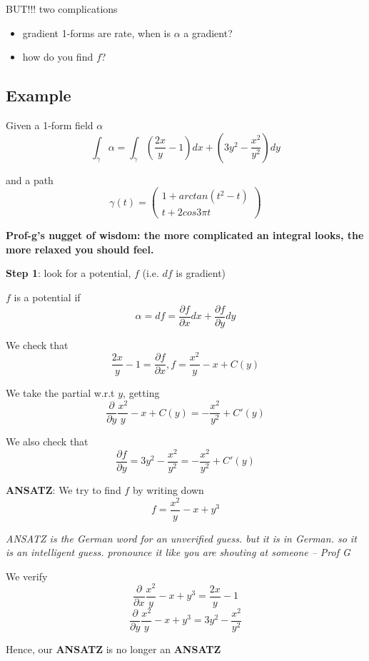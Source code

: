 BUT!!! two complications
\begin{itemize}
   \item gradient 1-forms are rate, when is $\alpha$ a gradient?
   \item how do you find $f$?
\end{itemize}

\subsection{Example}

Given a 1-form field $\alpha$
\[
   \int_{\gamma} \alpha = \int_{\gamma}^{} \left( \frac{2x}{y} - 1 \right) dx + \left( 3y^2 - \frac{x^2}{y^2} \right)  dy
\] 

and a path
\[
  \gamma(t) = \begin{pmatrix} 
    1 + arctan \left( t^2 - t \right)    \\ t + 2 cos 3\pi t
  \end{pmatrix}
\] 

\textbf{Prof-g's nugget of wisdom: the more complicated an integral looks, the more relaxed you should feel.  }

\textbf{Step 1}: look for a potential, $f$ (i.e. $df$ is gradient)

$f$ is a potential if 
\[
  \alpha = df = \frac{\partial f}{\partial x} dx + \frac{\partial f}{\partial y} dy
\] 

We check that
\[
  \frac{2x}{y} -1 = \frac{\partial f}{\partial x}, f = \frac{x^2}{y} - x + C(y)
\] 

We take the partial w.r.t $y$, getting
\[
  \frac{\partial }{\partial y} \frac{x^2}{y} - x + C(y) = -\frac{x^2}{y^2} + C'(y)
\] 

We also check that
\[
   \frac{\partial f}{\partial y} = 3y^2 - \frac{x^2}{y^2} = - \frac{x^2}{y^2} + C'(y) 
\] 

\textbf{ANSATZ}: We try to find $f$ by writing down
\[
  f = \frac{x^2}{y} - x + y^3
\] 

\textit{ANSATZ is the German word for an unverified guess. but it is in German. so it is an intelligent guess. pronounce it like you are shouting at someone -- Prof G}

We verify
\[
  \frac{\partial }{\partial x}  \frac{x^2}{y} - x + y^3 = \frac{2x}{y} - 1
\] 
\[
  \frac{\partial }{\partial y }  \frac{x^2}{y} - x + y^3 = 3y^2 - \frac{x^2}{y^2} 
\] 

Hence, our \textbf{ANSATZ} is no longer an \textbf{ANSATZ} \\

